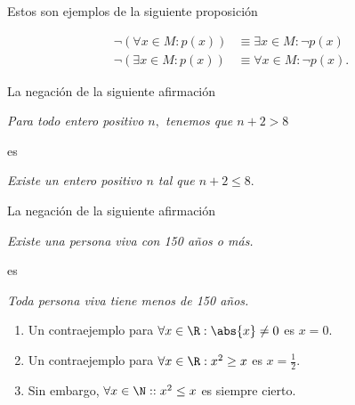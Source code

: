 Estos son ejemplos de la siguiente proposición

 \begin{teorema}[DeMorgan]
  \begin{align}
  \label{lip:thm:4.4}
   \neg\left( \forall x\in M: p(x) \right)& \equiv \exists x\in M: \neg p(x)\\
   \label{lip:thm:4.5}
   \neg\left( \exists x\in M: p(x) \right)& \equiv \forall x\in M: \neg p(x).
  \end{align}

 \end{teorema}




 \begin{ejemplo}
  \label{lip:exmp:4.10.a}
  La negación de la siguiente afirmación
  \begin{center}
   \emph{Para todo entero positivo $n,$ tenemos que $n+2>8$}
  \end{center}
es 
\begin{center}
 \emph{Existe un entero positivo $n$ tal que $n+2 \leq 8.$}
\end{center}

 \end{ejemplo}




 \begin{ejemplo}
  \label{lip:exmp:4.10.b}
  La negación de la siguiente afirmación
  \begin{center}
   \emph{Existe una persona viva con 150 a\~nos o más.}
  \end{center}
 es 
 \begin{center}
  \emph{Toda persona viva tiene menos de 150 a\~nos.}
 \end{center}

 \end{ejemplo}








 \begin{ejemplo}
 \label{lip:4.11}
  \begin{enumerate}
   \item 
  Un contraejemplo para $\forall x \in \R: \abs{x}\neq 0$ es $x=0.$  
   \item 
  Un contraejemplo para $\forall x \in \R: x^{2}\geq x$ es $x=\frac{1}{2}.$  
   \item 
  Sin embargo, $\forall x \in \N: : x^{2}\leq x$ es siempre cierto.
  \end{enumerate}

 \end{ejemplo}





